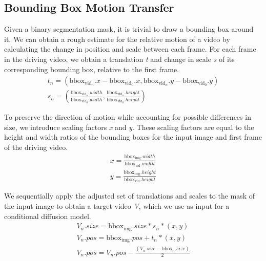 \subsection{Bounding Box Motion Transfer}


Given a binary segmentation mask, it is trivial to draw a bounding box around it. We can obtain a rough estimate for the relative motion of a video by calculating the change in position and scale between each frame.
For each frame in the driving video, we obtain a translation \textit{t} and change in scale \textit{s} of its corresponding bounding box, relative to the first frame.
\begin{equation}
    \begin{gathered}
        t_{n} = (\text{bbox}_{\text{vid}_n}.x-\text{bbox}_{\text{vid}_0}.x, \text{bbox}_{\text{vid}_n}.y-\text{bbox}_{\text{vid}_0}.y) \\
        s_{n} = (\frac{\text{bbox}_{\text{vid}_n}.width}{\text{bbox}_{\text{vid}_0}.width},\frac{\text{bbox}_{\text{vid}_n}.height}{\text{bbox}_{\text{vid}_0}.height})
    \end{gathered}
    \label{eq:transformation}
\end{equation}

To preserve the direction of motion while accounting for possible differences in size, we introduce scaling factors \textit{x} and \textit{y}.
These scaling factors are equal to the height and width ratios of the bounding boxes for the input image and first frame of the driving video.
\begin{equation}
    \begin{gathered}
        x = \frac{\text{bbox}_\text{img}.width}{\text{bbox}_\text{vid}.width} \\ y = \frac{\text{bbox}_\text{img}.height}{\text{bbox}_\text{vid}.height}
    \end{gathered}
    \label{eq:scaling}
\end{equation}

We sequentially apply the adjusted set of translations and scales to the mask of the input image to obtain a target video \textit{V}, which we use as input for a conditional diffusion model\cite{2023videocomposer}.
\begin{equation}
    \begin{gathered}
        V_{n}.size = \text{bbox}_\text{img}.size*s_{n}*(x,y) \\
        V_{n}.pos = \text{bbox}_\text{img}.pos + t_{n}*(x,y) \\
        V_{n}.pos = V_{n}.pos - \frac{(V_{n}.size-\text{bbox}_{n}.size)}{2}
    \end{gathered}
\end{equation}
